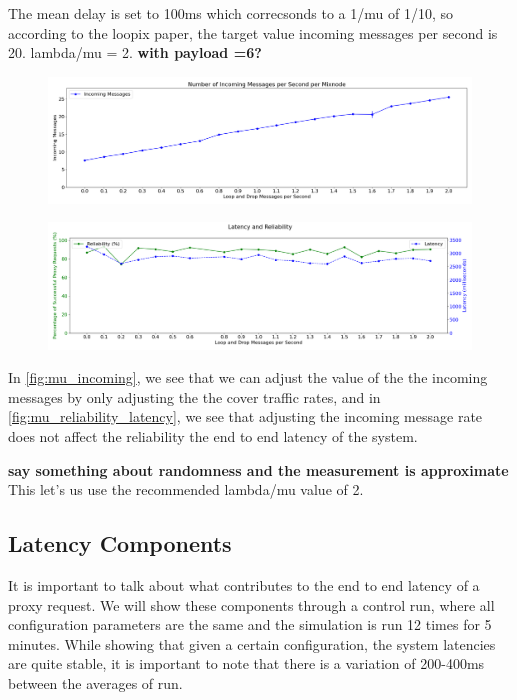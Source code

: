 \documentclass[a4paper,11pt,oneside]{report}
\begin{document}
The mean delay is set to 100ms which correcsonds to a 1/mu of 1/10, so according to the loopix paper, the target value incoming messages per second is 20. lambda/mu = 2. \textbf{with payload =6?}

\begin{figure}[htbp]
    \centering
    \includegraphics[width=\textwidth]{plots/mu_incoming_messages.png}
    \caption{}
    \label{fig:mu_incoming}
\end{figure}

\begin{figure}[htbp]
    \centering
    \includegraphics[width=\textwidth]{plots/mu_reliability_latency.png}
    \caption{}
    \label{fig:mu_reliability_latency}
\end{figure}

In \autoref{fig:mu_incoming}, we see that we can adjust the value of the the incoming messages by only adjusting the the cover traffic rates, and in \autoref{fig:mu_reliability_latency}, we see that adjusting the incoming message rate does not affect the reliability the end to end latency of the system.

\textbf{say something about randomness and the measurement is approximate}
This let's us use the recommended lambda/mu value of 2.

\subsection{Latency Components}
It is important to talk about what contributes to the end to end latency of a proxy request. We will show these components through a control run, where all configuration parameters are the same and the simulation is run 12 times for 5 minutes. While showing that given a certain configuration, the system latencies are quite stable, it is important to note that there is a variation of 200-400ms between the averages of run. 
\end{document}
